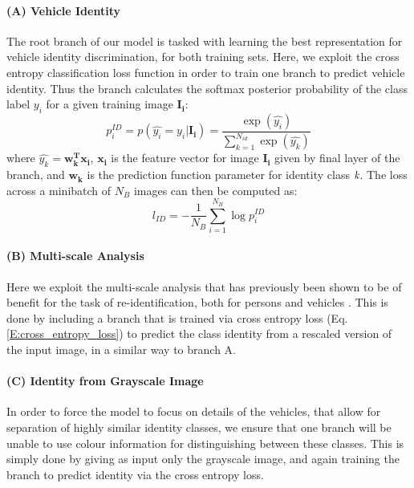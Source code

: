 \documentclass[10pt,twocolumn,letterpaper]{article}
\begin{document}
\paragraph{(A) Vehicle Identity}

The root branch of our model is tasked with learning the best representation for vehicle identity discrimination, for both training sets. Here, we exploit the cross entropy classification loss function in order to train one branch to predict vehicle identity. Thus the branch calculates the softmax posterior probability of the class label $y_i$ for a given training image $\mathbf{I_i}$:
\begin{equation}
  p_i^{ID} = p(\hat{y_i} = y_i|\mathbf{I_i}) = \frac{\exp(\hat{y_i})}{\sum_{k=1}^{N_{id}}\exp(\hat{y_k})}
  \label{E:softmax_id}
\end{equation}
where $\hat{y_k} = \mathbf{w_k^Tx_i}$, $\mathbf{x_i}$ is the feature vector for image $\mathbf{I_i}$ given by final layer of the branch, and $\mathbf{w_k}$ is the prediction function parameter for identity class $\emph{k}$. The loss across a minibatch of $N_B$ images can then be computed as:
\begin{equation}
  l_{ID} = -\frac{1}{N_B} \sum_{i=1}^{N_B} \log{p_i^{ID}}
  \label{E:cross_entropy_loss}
\end{equation}

\paragraph{(B) Multi-scale Analysis}

Here we exploit the multi-scale analysis that has previously been shown to be of benefit for the task of re-identification, both for persons \cite{chen2017person} and vehicles \cite{kanaci2018vehicle}. This is done by including a branch that is trained via cross entropy loss (Eq. \ref{E:cross_entropy_loss}) to predict the class identity from a rescaled version of the input image, in a similar way to branch A.

\paragraph{(C) Identity from Grayscale Image}

In order to force the model to focus on details of the vehicles, that allow for separation of highly similar identity classes, we ensure that one branch will be unable to use colour information for distinguishing between these classes. This is simply done by giving as input only the grayscale image, and again training the branch to predict identity via the cross entropy loss.
\end{document}
